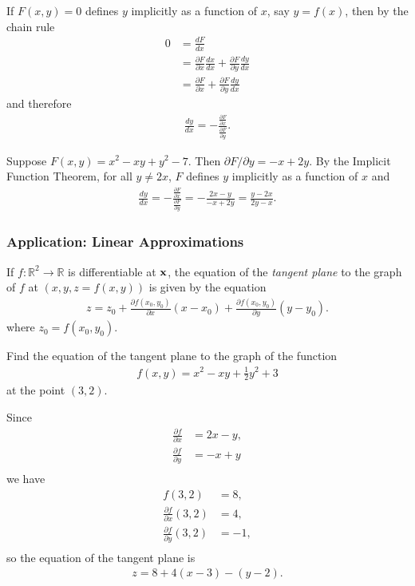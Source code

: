 \documentclass[12pt,letterpaper,reqno]{article}
\numberwithin{equation}{section}
\newcommand{\R}{\ensuremath{\mathbb R}}
\newcommand{\bx}{{\bf x}}
\begin{document}
{If $F(x,y)=0$ defines $y$ implicitly as a function of $x$, say $y=f(x)$, then by the chain rule
\begin{align*}
	0&=\frac{d F}{d x} \\
	&=\frac{\partial F}{\partial x}\frac{dx}{dx}+ \frac{\partial F}{\partial y}\frac{dy}{dx}\\
	&=\frac{\partial F}{\partial x}+ \frac{\partial F}{\partial y}\frac{dy}{dx}
\end{align*}
and therefore
\begin{align*}
	\frac{dy}{dx}=-\frac{\frac{\partial F}{\partial x}}{\frac{\partial F}{\partial y}}.
\end{align*}

\begin{example}
Suppose $F(x,y)=x^2-xy+y^2-7$. Then $\partial F/\partial y=-x+2y$. By the Implicit Function Theorem, for all $y \neq 2x$, $F$ defines $y$ implicitly as a function of $x$ and 
\begin{align*}
	\frac{dy}{dx}=-\frac{\frac{\partial F}{\partial x}}{\frac{\partial F}{\partial y}}=-\frac{2x-y}{-x+2y}=\frac{y-2x}{2y-x}.
\end{align*}
\end{example}

\subsubsection{Application: Linear Approximations}
If $f:\R^2 \to \R$ is differentiable at $\bx$, the equation of the \emph{tangent plane} to the graph of $f$ at $(x,y,z=f(x,y))$ is given by the equation
\begin{align*}
	z=z_0+\frac{\partial f(x_0,y_0)}{\partial x}(x-x_0)+\frac{\partial f(x_0,y_0)}{\partial y}(y-y_0).
\end{align*}
where $z_0=f(x_0,y_0)$.

\begin{exercise}
Find the equation of the tangent plane to the graph of the function
\begin{align*}
	f(x,y)=x^2-xy+\frac{1}{2}y^2+3
\end{align*}	
at the point $(3,2)$.
\end{exercise}

{\color{red}
\begin{solution}
Since
\begin{align*}
	\frac{\partial f}{\partial x}&=2x-y, \\
	\frac{\partial f}{\partial y}&=-x+y \\
\end{align*}
we have
\begin{align*}
	f(3,2)&=8, \\
	\frac{\partial f}{\partial x}(3,2)&=4, \\
	\frac{\partial f}{\partial y}(3,2)&=-1, \\
\end{align*}	
so the equation of the tangent plane is
\begin{align*}
	z=8+4(x-3)-(y-2).
\end{align*}
\end{solution}

}}
\end{document}
